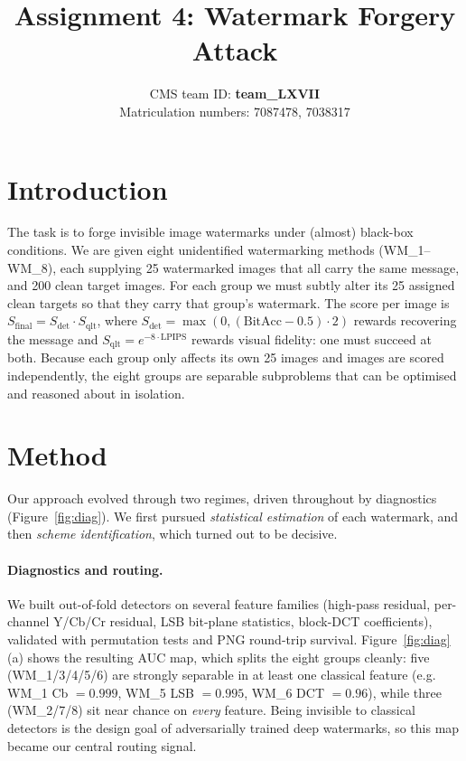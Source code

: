 \documentclass{article}
\title{Assignment 4: Watermark Forgery Attack}
\author{CMS team ID: \textbf{team\_LXVII}\\Matriculation numbers: 7087478, 7038317 }
\begin{document}
\maketitle

\section{Introduction}
The task is to forge invisible image watermarks under (almost) black-box conditions. We are given eight unidentified watermarking methods (WM\_1--WM\_8), each supplying 25 watermarked images that all carry the same message, and 200 clean target images. For each group we must subtly alter its 25 assigned clean targets so that they carry that group's watermark. The score per image is $S_{\mathrm{final}} = S_{\mathrm{det}}\cdot S_{\mathrm{qlt}}$, where $S_{\mathrm{det}}=\max(0,(\mathrm{BitAcc}-0.5)\cdot 2)$ rewards recovering the message and $S_{\mathrm{qlt}}=e^{-8\cdot\mathrm{LPIPS}}$ rewards visual fidelity: one must succeed at both. Because each group only affects its own 25 images and images are scored independently, the eight groups are separable subproblems that can be optimised and reasoned about in isolation.

\section{Method}
Our approach evolved through two regimes, driven throughout by diagnostics (Figure~\ref{fig:diag}). We first pursued \emph{statistical estimation} of each watermark, and then \emph{scheme identification}, which turned out to be decisive.

\paragraph{Diagnostics and routing.} We built out-of-fold detectors on several feature families (high-pass residual, per-channel Y/Cb/Cr residual, LSB bit-plane statistics, block-DCT coefficients), validated with permutation tests and PNG round-trip survival. Figure~\ref{fig:diag}(a) shows the resulting AUC map, which splits the eight groups cleanly: five (WM\_1/3/4/5/6) are strongly separable in at least one classical feature (e.g. WM\_1 Cb $=0.999$, WM\_5 LSB $=0.995$, WM\_6 DCT $=0.96$), while three (WM\_2/7/8) sit near chance on \emph{every} feature. Being invisible to classical detectors is the design goal of adversarially trained deep watermarks, so this map became our central routing signal.
\end{document}
